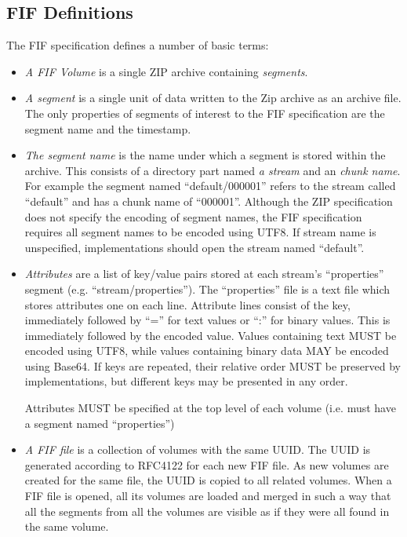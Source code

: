 \documentclass[12pt, conference]{IEEEtran}
\begin{document}
\subsection{FIF Definitions}
The FIF specification defines a number of basic terms:
\begin{itemize}
\item {\em A FIF Volume} is a single ZIP archive containing {\em
segments}.

\item {\em A segment} is a single unit of data written to the Zip
archive as an archive file. The only properties of segments of
interest to the FIF specification are the segment name and the
timestamp.

\item {\em The segment name} is the name under which a segment is
stored within the archive. This consists of a directory part named
{\em a stream} and an {\em chunk name}. For example the segment named
``default/000001'' refers to the stream called ``default'' and has a
chunk name of ``000001''. Although the ZIP specification does not
specify the encoding of segment names, the FIF specification requires
all segment names to be encoded using UTF8. If stream name is
unspecified, implementations should open the stream named ``default''.

\item {\em Attributes} are a list of key/value pairs stored at each
stream's ``properties'' segment (e.g. ``stream/properties''). The
``properties'' file is a text file which stores attributes one on each
line. Attribute lines consist of the key, immediately followed by
``='' for text values or ``:'' for binary values. This is immediately
followed by the encoded value. Values containing text MUST be encoded
using UTF8, while values containing binary data MAY be encoded using
Base64. If keys are repeated, their relative order MUST be preserved
by implementations, but different keys may be presented in any order.

Attributes MUST be specified at the top level of each volume
(i.e. must have a segment named ``properties'')


\item {\em A FIF file} is a collection of volumes with the same
UUID. The UUID is generated according to RFC4122 for each new FIF
file. As new volumes are created for the same file, the UUID is copied
to all related volumes. When a FIF file is opened, all its volumes are
loaded and merged in such a way that all the segments from all the
volumes are visible as if they were all found in the same volume.

\end{itemize}
\end{document}
